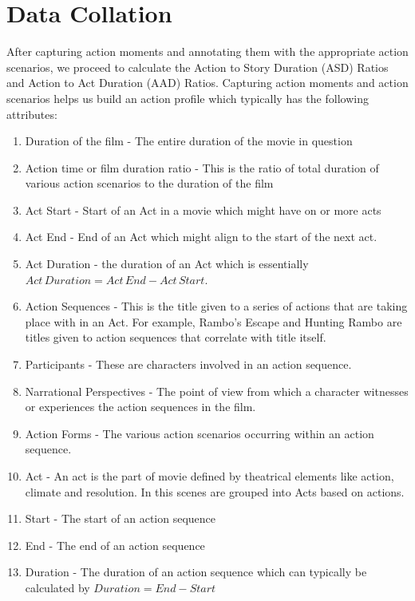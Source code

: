 \documentclass[12pt]{report}
\begin{document}
	\section{Data Collation}
	After capturing action moments and annotating them with the appropriate action scenarios, we proceed to calculate the Action to Story Duration (ASD) Ratios and Action to Act Duration (AAD) Ratios. Capturing action moments and action scenarios helps us build an action profile which typically has the following attributes:
	
	\begin{enumerate}
		\item Duration of the film - The entire duration of the movie in question
		\item Action time or film duration ratio - This is the ratio of total duration of various action scenarios to the duration of the film
		\item Act Start - Start of an Act in a movie which might have on or more acts
		\item Act End - End of an Act which might align to the start of the next act.
		\item Act Duration - the duration of an Act which is essentially $Act\,Duration = Act\,End - Act\,Start$.
		\item Action Sequences - This is the title given to a series of actions that are taking place with in an Act. For example, Rambo's Escape and Hunting Rambo are titles given to action sequences that correlate with title itself.
		\item Participants - These are characters involved in an action sequence.
		\item Narrational Perspectives - The point of view from which a character witnesses or experiences the action sequences in the film.
		\item Action Forms - The various action scenarios occurring within an action sequence.
		\item Act - \cite{chris-baldwin} An act is the part of movie defined by theatrical elements like action, climate and resolution. In this scenes are grouped into Acts based on actions.
		\item Start - The start of an action sequence
		\item End - The end of an action sequence
		\item Duration - The duration of an action sequence which can typically be calculated by $Duration = End - Start$
	\end{enumerate}
	
\end{document}
